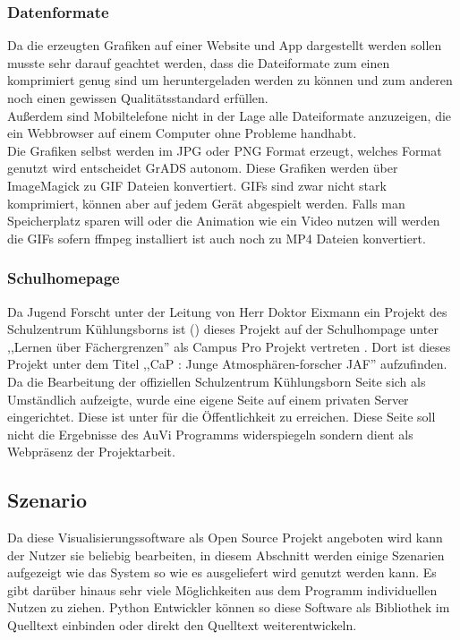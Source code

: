 \subsubsection{Datenformate} %
Da die erzeugten Grafiken auf einer Website und App dargestellt werden sollen
musste sehr darauf geachtet werden,
dass die Dateiformate zum einen komprimiert genug sind
um heruntergeladen werden zu können und zum anderen
noch einen gewissen Qualitätsstandard erfüllen.\\
Außerdem sind Mobiltelefone nicht in der Lage alle
Dateiformate anzuzeigen,
die ein Webbrowser auf einem Computer ohne Probleme handhabt.\\
Die Grafiken selbst werden im JPG oder PNG Format erzeugt, welches
Format genutzt wird entscheidet GrADS autonom. Diese Grafiken werden
über ImageMagick zu GIF Dateien konvertiert. GIFs sind zwar nicht stark
komprimiert, können aber auf jedem Gerät abgespielt werden.
Falls man Speicherplatz sparen will oder die Animation wie ein Video nutzen will
werden die GIFs sofern ffmpeg installiert ist auch noch zu MP4 Dateien konvertiert.

\subsubsection{Schulhomepage} %
Da Jugend Forscht unter der Leitung von Herr Doktor Eixmann
ein Projekt des Schulzentrum Kühlungsborns ist
() dieses Projekt auf der Schulhompage
unter ,,Lernen über Fächergrenzen'' als Campus Pro Projekt vertreten \cite{szkb}.
Dort ist dieses Projekt unter dem Titel ,,CaP \jf : Junge Atmosphären-forscher JAF'' aufzufinden.
Da die Bearbeitung der offiziellen Schulzentrum Kühlungsborn Seite sich als Umständlich aufzeigte,
wurde eine eigene Seite auf einem privaten Server eingerichtet.
Diese ist unter 
für die Öffentlichkeit zu erreichen.
Diese Seite soll nicht die Ergebnisse des AuVi Programms
widerspiegeln sondern dient als Webpräsenz der Projektarbeit.

\subsection{Szenario} %
Da diese Visualisierungssoftware als Open Source Projekt angeboten wird kann der Nutzer
sie beliebig bearbeiten, in diesem Abschnitt werden einige Szenarien aufgezeigt wie das System
so wie es ausgeliefert wird genutzt werden kann.
Es gibt darüber hinaus sehr viele Möglichkeiten aus dem Programm individuellen Nutzen zu ziehen.
Python Entwickler können so diese Software als Bibliothek im Quelltext einbinden oder direkt den Quelltext
weiterentwickeln.

